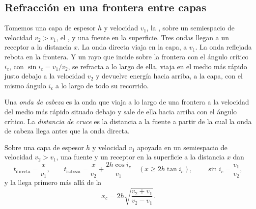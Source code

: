 \subsection{Refracción en una frontera entre capas}

Tomemos una capa de espesor $h$ y velocidad $v_1$, la , sobre un semiespacio de velocidad $v_2 > v_1$, el , y
una fuente en la superficie. Tres ondas llegan a un receptor a la distancia $x$. La onda directa viaja en la capa, a $v_1$.
La onda reflejada rebota en la frontera. Y un rayo que incide sobre la frontera con el ángulo crítico $i_c$, con
$\sin i_c = v_1/v_2$, se refracta a lo largo de ella, viaja en el medio más rápido justo debajo a la velocidad $v_2$ y
devuelve energía hacia arriba, a la capa, con el mismo ángulo $i_c$ a lo largo de todo su recorrido.

\begin{definition}\label{def:b1:layered-earth:head-wave}
Una \emph{onda de cabeza} es la onda que viaja a lo largo de una frontera a la velocidad del medio
más rápido situado debajo y sale de ella hacia arriba con el ángulo crítico. La \emph{distancia de cruce} es la distancia a la fuente a partir de la cual la onda de cabeza llega antes que la onda directa.
\end{definition}
\begin{theorem}\label{thm:b1:layered-earth:two-layer}
Sobre una capa de espesor $h$ y velocidad $v_1$ apoyada en un semiespacio de velocidad $v_2 > v_1$, una fuente y un
receptor en la superficie a la distancia $x$ dan
\[
  t_{\text{directa}} = \frac{x}{v_1}, \qquad
  t_{\text{cabeza}} = \frac{x}{v_2} + \frac{2h\cos i_c}{v_1}
  \quad (x \ge 2h\tan i_c), \qquad \sin i_c = \frac{v_1}{v_2},
\]
y la  llega primero más allá de la 
\[
  x_c = 2h\sqrt{\frac{v_2 + v_1}{v_2 - v_1}}.
\]
\end{theorem}

